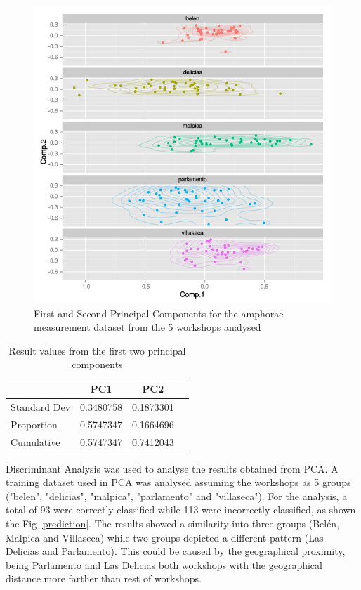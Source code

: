 \documentclass[review]{elsarticle}
\begin{document}
\begin{figure}[htp]
	\centering
\includegraphics[scale=0.47]{pca.png}
\caption{First and Second Principal Components for the amphorae measurement dataset from the 5 workshops analysed}
\label{pca}
\end{figure} 


\begin{table}[htp]
\begin{tabular}{lccc}
\hline
      		&  PC1 & PC2	 \\ \hline
Standard Dev&0.3480758&0.1873301&\\
Proportion  &0.5747347&0.1664696&\\
Cumulative  &0.5747347&0.7412043& \\

\end{tabular}
\caption{Result values from the first two principal components}
\label{table:spatgeo}
\end{table}

Discriminant Analysis was used to analyse the results obtained from PCA.  A training dataset used in PCA was analysed assuming the workshops as 5 groups ("belen", "delicias", "malpica", "parlamento" and "villaseca"). For the analysis, a total of 93 were correctly classified while 113 were incorrectly classified, as shown the Fig \ref{prediction}. The results showed a similarity into three groups (Bel\'en, Malpica and Villaseca) while two groups depicted a different pattern (Las Delicias and Parlamento). This could be caused by the geographical proximity, being Parlamento and Las Delicias both workshops with the geographical distance more farther than rest of workshops. 
\end{document}
